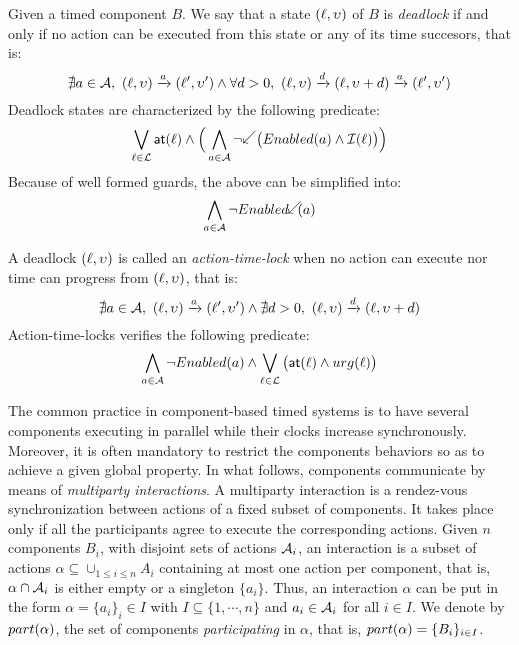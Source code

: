 \begin{definition}[Deadlocks]
  Given a timed component $B$. We say that a state $(\ell,\upsilon)$ of $B$ is 
  \emph{deadlock} if and only if no action can be executed from this state
  or any of its time succesors, that is:
  \begin{displaymath}
    \nexists a\in\mc{A}, \ (\loc,\val)\transit{a}(\loc',\val')\wedge
    \forall d>0, \ (\loc,\val)\transit{d}(\loc,\val+d)\transit{a}(\loc',\val')
  \end{displaymath}
  Deadlock states are characterized by the following predicate:
  \begin{displaymath}
    \bigvee_{\loc\in\Loc}\al{\loc}\wedge\Big(\bigwedge_{a\in\mc{A}}
    \neg \backward\big(\enabled{a}\wedge\Inv{\loc}\big)\Big)
  \end{displaymath}
  Because of well formed guards, the above can be simplified into:
  \begin{displaymath}
    \bigwedge_{a\in\mc{A}}\neg\enabledbackward{a}
  \end{displaymath}
\end{definition}
A deadlock $(\ell,\upsilon)$ is called an \emph{action-time-lock} when no action can
execute nor time can progress from $(\ell,\upsilon)$, that is:
  \begin{displaymath}
    \nexists a\in\mc{A}, \ (\loc,\val)\transit{a}(\loc',\val')\wedge
    \nexists d>0, \ (\loc,\val)\transit{d}(\loc,\val+d)
  \end{displaymath}
  Action-time-locks verifies the following predicate:
  \begin{displaymath}
    \bigwedge_{a\in\mathcal{A}}\neg Enabled(a)\wedge\bigvee_{\ell\in\mathcal{L}}
    \big(\textsf{at}(\ell)\wedge urg(\ell)\big)
  \end{displaymath}

The common practice in component-based timed systems is to have several components
executing in parallel while their clocks increase synchronously. Moreover,
it is often mandatory to restrict the components behaviors so as to achieve 
a given global property. In what follows, components communicate by means
of \emph{multiparty interactions}. A multiparty interaction is a rendez-vous 
synchronization between actions of a fixed subset of components. It takes place 
only if all the participants agree to execute the corresponding actions. Given 
$n$ components $B_i$, with disjoint sets of actions $\mathcal{A}_i$, an interaction
is a subset of actions $\alpha\subseteq\cup_{1\le i\le n}A_i$ containing at most
one action per component, that is, $\alpha\cap\mathcal{A}_i$ is either empty or a 
singleton $\{a_i\}$. Thus, an interaction $\alpha$ can be put in the form
$\alpha=\{a_i\}_i{\in{I}}$ with $I\subseteq\{1,\cdots,n\}$ and $a_i\in\mathcal{A}_i$
for all $i\in{I}$. We denote by $part(\alpha)$, the set of components \emph{participating}
in $\alpha$, that is, $part(\alpha)=\{B_i\}_{i\in{I}}$.

